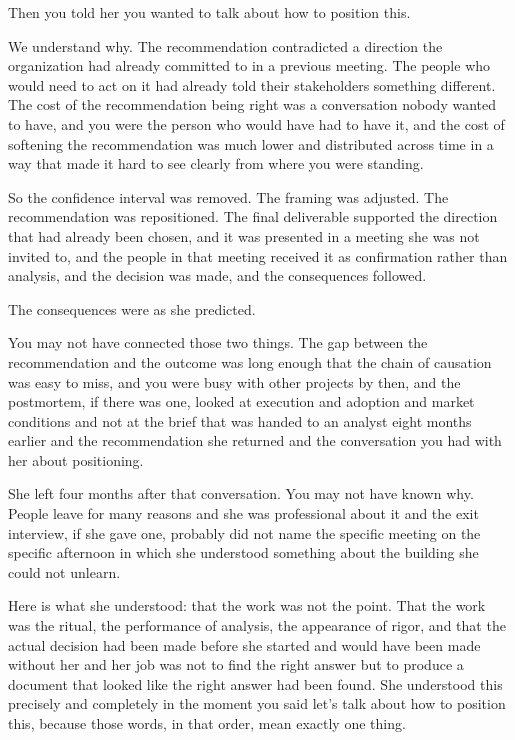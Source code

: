Then you told her you wanted to talk about how to position this.

We understand why. The recommendation contradicted a direction the organization had already committed to in a previous meeting. The people who would need to act on it had already told their stakeholders something different. The cost of the recommendation being right was a conversation nobody wanted to have, and you were the person who would have had to have it, and the cost of softening the recommendation was much lower and distributed across time in a way that made it hard to see clearly from where you were standing.

So the confidence interval was removed. The framing was adjusted. The recommendation was repositioned. The final deliverable supported the direction that had already been chosen, and it was presented in a meeting she was not invited to, and the people in that meeting received it as confirmation rather than analysis, and the decision was made, and the consequences followed.

The consequences were as she predicted.

You may not have connected those two things. The gap between the recommendation and the outcome was long enough that the chain of causation was easy to miss, and you were busy with other projects by then, and the postmortem, if there was one, looked at execution and adoption and market conditions and not at the brief that was handed to an analyst eight months earlier and the recommendation she returned and the conversation you had with her about positioning.

She left four months after that conversation. You may not have known why. People leave for many reasons and she was professional about it and the exit interview, if she gave one, probably did not name the specific meeting on the specific afternoon in which she understood something about the building she could not unlearn.

Here is what she understood: that the work was not the point. That the work was the ritual, the performance of analysis, the appearance of rigor, and that the actual decision had been made before she started and would have been made without her and her job was not to find the right answer but to produce a document that looked like the right answer had been found. She understood this precisely and completely in the moment you said let's talk about how to position this, because those words, in that order, mean exactly one thing.

